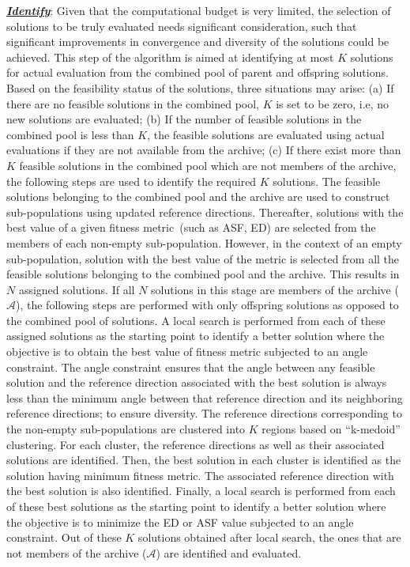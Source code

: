 \documentclass[twocolumn,10pt]{asme2ej}
\begin{document}
\noindent \underline{\it \textbf{Identify}}: Given that the computational budget is very limited, the selection of solutions to be truly evaluated needs significant consideration, such that significant improvements in convergence and diversity of the solutions could be achieved. This step of the algorithm is aimed at identifying at most $K$ solutions for actual evaluation from the combined pool of parent and offspring solutions. Based on the feasibility status of the solutions, three situations may arise: (a) If there are no feasible solutions in the combined pool, $K$ is set to be zero, i.e, no new solutions are evaluated;  (b) If the number of feasible solutions in the combined pool is less than $K$, the feasible solutions are evaluated using actual evaluations if they are not available from the archive; (c) If there exist more than $K$ feasible solutions in the combined pool which are not members of the archive, the following steps are used to identify the required $K$ solutions. The feasible solutions belonging to the combined pool and the archive are used to construct sub-populations using updated reference directions. Thereafter, solutions with the best value of a given fitness metric~(such as ASF, ED) are selected from the members of each non-empty sub-population. However, in the context of an empty sub-population, solution with the best value of the metric is selected from all the feasible solutions belonging to the combined pool and the archive. This results in $N$ assigned solutions. If all $N$ solutions in this stage are members of the archive ($\mathcal{A}$), the following steps are performed with only offspring solutions as opposed to the combined pool of solutions. A local search is performed from each of these assigned solutions as the starting point to identify a better solution where the objective is to obtain the best value of fitness metric subjected to an angle constraint. The angle constraint ensures that the angle between any feasible solution and the reference direction associated with the best solution is always less than the minimum angle between that reference direction and {\color{blue}its neighboring} reference directions; to ensure diversity. The reference directions corresponding to the non-empty sub-populations are clustered into $K$ regions based on ``k-medoid'' clustering. For each cluster, the reference directions as well as their associated solutions are identified. Then, the best solution in each cluster is identified as the solution having minimum fitness metric. The associated reference direction with the best solution is also identified. Finally, a local search is performed from each of these best solutions as the starting point to identify a better solution where the objective is to minimize the ED or ASF value subjected to an angle constraint. Out of these $K$ solutions obtained after local search, the ones that are not members of the archive ($\mathcal{A}$) are identified and evaluated.    
\end{document}

